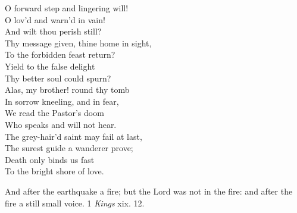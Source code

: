  O forward step and lingering will! \\
 O lov’d and warn’d in vain! \\
 And wilt thou perish still? \\
  Thy message given, thine home in sight, \\
 To the forbidden feast return? \\
 Yield to the false delight \\
 Thy better soul could spurn? \\
  Alas, my brother! round thy tomb \\
 In sorrow kneeling, and in fear, \\
 We read the Pastor’s doom \\
 Who speaks and will not hear. \\
  The grey-hair’d saint may fail at last, \\
 The surest guide a wanderer prove; \\
 Death only binds us fast \\
 To the bright shore of love.\\


And after the earthquake a fire; but the Lord was not in the fire: and after the fire a still small voice. 1 \emph{Kings} xix. 12.

